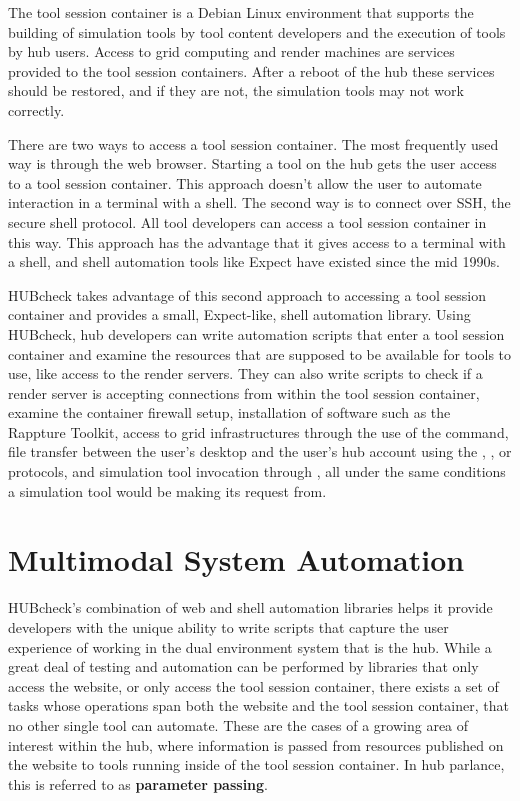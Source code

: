 The tool session container is a Debian Linux environment that supports the
building of simulation tools by tool content developers and the execution of
tools by hub users. Access to grid computing and render machines are services
provided to the tool session containers. After a reboot of the hub these
services should be restored, and if they are not, the simulation tools may not
work correctly.

There are two ways to access a tool session container. The most frequently used
way is through the web browser. Starting a tool on the hub gets the user access
to a tool session container. This approach doesn't allow the user to automate
interaction in a terminal with a shell. The second way is to connect over SSH,
the secure shell protocol. All tool developers can access a tool session
container in this way. This approach has the advantage that it gives access to
a terminal with a shell, and shell automation tools like Expect
\cite{libes1995exploring} have existed since the mid 1990s.

HUBcheck takes advantage of this second approach to accessing a tool session
container and provides a small, Expect-like, shell automation library. Using
HUBcheck, hub developers can write automation scripts that enter a tool session
container and examine the resources that are supposed to be available for tools
to use, like access to the render servers. They can also write scripts to check
if a render server is accepting connections from within the tool session
container, examine the container firewall setup, installation of software such
as the Rappture Toolkit, access to grid infrastructures through the
use of the  command, file transfer between the user's desktop
and the user's hub account using the , , or
 protocols, and simulation tool invocation through
, all under the same conditions a simulation tool would be
making its request from.


\section{Multimodal System Automation}
\label{sec:problem_automation}


HUBcheck's combination of web and shell automation libraries helps it provide
developers with the unique ability to write scripts that capture the user
experience of working in the dual environment system that is the hub. While a
great deal of testing and automation can be performed by libraries that only
access the website, or only access the tool session container, there exists a
set of tasks whose operations span both the website and the tool session
container, that no other single tool can automate. These are the cases of a
growing area of interest within the hub, where information is passed from
resources published on the website to tools running inside of the tool session
container. In hub parlance, this is referred to as \textbf{parameter passing}.

